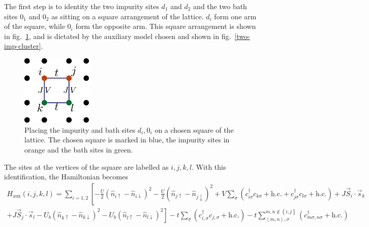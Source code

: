 \documentclass[10pt]{report}
\numberwithin{equation}{section}
\begin{document}
The first step is to identity the two impurity sites \(d_1\) and \(d_2\) and the two bath sites \(0_1\) and \(0_2\) as sitting on a square arrangement of the lattice. \(d_i\) form one arm of the square, while \(0_i\) form the opposite arm.
This square arrangement is shown in fig.~\ref{square-arms}, and is dictated by the auxiliary model chosen and shown in fig.~\ref{two-imp-cluster}.
\begin{figure}[!htb]
	\centering
	\includegraphics[width=0.3\textwidth]{../figures/square_arms.pdf}
	\caption{Placing the impurity and bath sites \(d_i,0_i\) on a chosen square of the lattice. The chosen square is marked in blue, the impurity sites in orange and the bath sites in green.}
	\label{square-arms}
\end{figure}
The sites at the vertices of the square are labelled as \(i,j,k,l\). With this identification, the Hamiltonian becomes
\begin{equation}\begin{aligned}
	H_\text{aux}(i,j,k,l) = \sum_{i=1,2} \left[- \frac{U}{2}\left(\hat n_{i \uparrow} - \hat n_{i \downarrow}\right)^2 - \frac{U}{2}\left(\hat n_{j \uparrow} - \hat n_{j \downarrow}\right)^2 + V\sum_{\sigma}\left(c^\dagger_{i\sigma}c_{k\sigma} + \text{h.c.} + c^\dagger_{j\sigma}c_{l\sigma} + \text{h.c.}\right) + J \vec{S}_{i}\cdot\vec{s}_{k} \right.\\
+ \left. J \vec{S}_{j}\cdot\vec{s}_{l} - U_b\left(\hat n_{k \uparrow} - \hat n_{k \downarrow}\right)^2 - U_b\left(\hat n_{l \uparrow} - \hat n_{l \downarrow}\right)^2\right] -t \sum_\sigma \left(c^\dagger_{i,\sigma}c_{j,\sigma} + \text{h.c.}\right) -t \sum_{\left<m,n \right>, \sigma}^{m,n \notin \left\{i,j\right\}}\left(c^\dagger_{m\sigma,n\sigma} + \text{h.c.}\right) 
\end{aligned}\end{equation}
\end{document}
